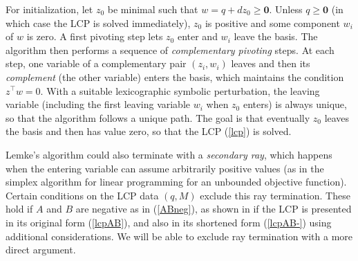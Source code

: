 \documentclass[a4paper,12pt]{article}  %
\newtheorem{theorem}{Theorem}
\theoremstyle{definition}
\def\proof{\noindent{\em Proof.\enspace}}
\def\endproof{\hfill\strut\nobreak\hfill\tombstone\par\medbreak}
\def\tombstone{\hbox{\lower.4pt\vbox{\hrule\hbox{\vrule
  \kern7.6pt\vrule height7.6pt}\hrule}\kern.5pt}}
\newcommand{\T}{^{\top}}
\newcommand{\0}{{\mathbf0}}
\newcommand{\1}{{\mathbf1}}
\begin{document}
For initialization, let $z_0$ be minimal such that $w=q+dz_0\ge\0$.
Unless $q\ge\0$ (in which case the LCP is solved
immediately), $z_0$ is positive and some component $w_i$ of
$w$ is zero.
A first pivoting step lets $z_0$ enter and $w_i$ leave the
basis.
The algorithm then performs a sequence of
\textit{complementary pivoting} steps.
At each step, one variable of a complementary pair $(z_i,w_i)$
leaves and then its \textit{complement} (the other variable)
enters the basis, which maintains the condition $z\T w=0$.
With a suitable lexicographic symbolic perturbation, the
leaving variable (including the first leaving variable $w_i$
when $z_0$ enters) is always unique, so that the algorithm
follows a unique path.
The goal is that eventually $z_0$ leaves the basis and then
has value zero, so that the LCP (\ref{lcp}) is solved.

Lemke's algorithm could also terminate with a
\textit{secondary ray}, which happens when the entering
variable can assume arbitrarily positive values (as in the
simplex algorithm for linear programming for an unbounded
objective function).
Certain conditions on the LCP data $(q,M)$ exclude this ray
termination.
These hold if $A$ and $B$ are negative as in (\ref{ABneg}),
as shown in \citet[theorem 4.1]{KMvS96} if the LCP is
presented in its original form (\ref{lcpAB}), and also in
its shortened form (\ref{lcpAB-}) using additional
considerations.
We will be able to exclude ray termination with a more
direct argument.

% 
% 
\end{document}

